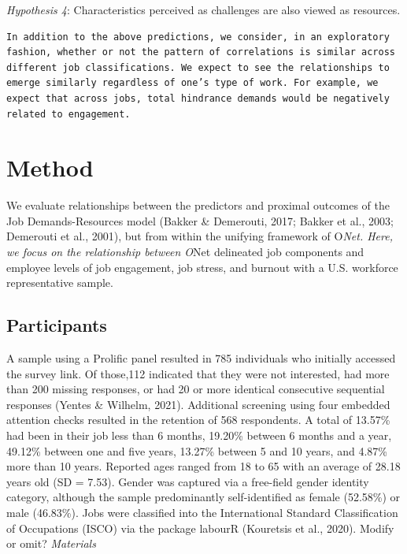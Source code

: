 \documentclass[
  man]{apa6}
\begin{document}
\emph{Hypothesis 4}: Characteristics perceived as challenges are also viewed as resources.

\begin{verbatim}
In addition to the above predictions, we consider, in an exploratory fashion, whether or not the pattern of correlations is similar across different job classifications. We expect to see the relationships to emerge similarly regardless of one’s type of work. For example, we expect that across jobs, total hindrance demands would be negatively related to engagement.
\end{verbatim}

\hypertarget{method}{%
\section{Method}\label{method}}

We evaluate relationships between the predictors and proximal outcomes of the Job Demands-Resources model (Bakker \& Demerouti, 2017; Bakker et al., 2003; Demerouti et al., 2001), but from within the unifying framework of O\emph{Net. Here, we focus on the relationship between O}Net delineated job components and employee levels of job engagement, job stress, and burnout with a U.S. workforce representative sample.

\hypertarget{participants}{%
\subsection{Participants}\label{participants}}

A sample using a Prolific panel resulted in 785 individuals who initially accessed the survey link. Of those,112 indicated that they were not interested, had more than 200 missing responses, or had 20 or more identical consecutive sequential responses (Yentes \& Wilhelm, 2021). Additional screening using four embedded attention checks resulted in the retention of 568 respondents. A total of 13.57\% had been in their job less than 6 months, 19.20\% between 6 months and a year, 49.12\% between one and five years, 13.27\% between 5 and 10 years, and 4.87\% more than 10 years. Reported ages ranged from 18 to 65 with an average of 28.18 years old (SD = 7.53). Gender was captured via a free-field gender identity category, although the sample predominantly self-identified as female (52.58\%) or male (46.83\%). Jobs were classified into the International Standard Classification of Occupations (ISCO) via the package labourR (Kouretsis et al., 2020). Modify or omit?
\emph{Materials}
\end{document}
